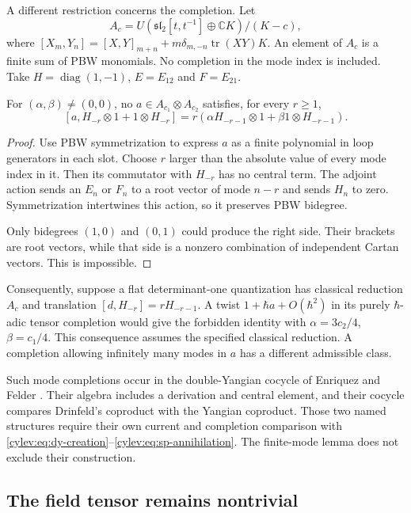 A different restriction concerns the completion.
Let
\[
 A_c=U(\mathfrak{sl}_2[t,t^{-1}]\oplus\mathbb CK)/(K-c),
\]
where
$[X_m,Y_n]=[X,Y]_{m+n}
+m\delta_{m,-n}\operatorname{tr}(XY)K$.
An element of $A_c$ is a finite sum of PBW monomials.
No completion in the mode index is included.
Take $H=\operatorname{diag}(1,-1)$, $E=E_{12}$ and $F=E_{21}$.

\begin{lemma}\label{cylev:lem:finite-mode}
For $(\alpha,\beta)\ne(0,0)$, no
$a\in A_{c_1}\otimes A_{c_2}$ satisfies, for every $r\geq1$,
\[
 [a,H_{-r}\otimes1+1\otimes H_{-r}]
       =r(\alpha H_{-r-1}\otimes1+\beta1\otimes H_{-r-1}).
\]
\end{lemma}
\begin{proof}
Use PBW symmetrization to express $a$ as a finite polynomial in
loop generators in each slot.
Choose $r$ larger than the absolute value of every mode index in it.
Then its commutator with $H_{-r}$ has no central term.
The adjoint action sends an $E_n$ or $F_n$ to a root vector of mode
$n-r$ and sends $H_n$ to zero.
Symmetrization intertwines this action, so it preserves PBW bidegree.

Only bidegrees $(1,0)$ and $(0,1)$ could produce the right side.
Their brackets are root vectors, while that side is a nonzero
combination of independent Cartan vectors. This is impossible.
\end{proof}

Consequently, suppose a flat determinant-one quantization has
classical reduction $A_c$ and translation
$[d,H_{-r}]=rH_{-r-1}$.
A twist $1+\hbar a+O(\hbar^2)$ in its purely $\hbar$-adic tensor
completion would give the forbidden identity with
$\alpha=3c_2/4$, $\beta=c_1/4$.
This consequence assumes the specified classical reduction.
A completion allowing infinitely many modes in $a$ has a different
admissible class.

Such mode completions occur in the double-Yangian cocycle of
Enriquez and Felder \cite[\S1, Theorem~3.1 and Proposition~5.1]{EnriquezFelder1997}.
Their algebra includes a derivation and central element, and their
cocycle compares Drinfeld's coproduct with the Yangian coproduct.
Those two named structures require their own current and completion
comparison with \eqref{cylev:eq:dy-creation}--\eqref{cylev:eq:sp-annihilation}.
The finite-mode lemma does not exclude their construction.

\subsection{The field tensor remains nontrivial}

